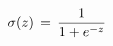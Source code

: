 \documentclass[preview]{standalone}
\begin{document}
\begin{align*}
\special{dvisvgm:raw <g id='unique000'>}\sigma(z)\,=\,\frac{1}{1+e^{-z}}\special{dvisvgm:raw </g>}
\end{align*}
\end{document}
